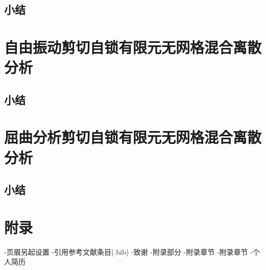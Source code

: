 \documentclass[internationalmaster]{hquThesis}
\begin{document}
\section{小结}


\chapter{自由振动剪切自锁有限元无网格混合离散分析}



\section{小结}


\chapter{屈曲分析剪切自锁有限元无网格混合离散分析}



\section{小结}



% 
\appendix
\chapter{附录}



\backmatter-页眉另起设置
-引用参考文献条目(.bib)
-致谢
\appendix-附录部分
-附录章节
-附录章节
-个人简历
\end{document}
